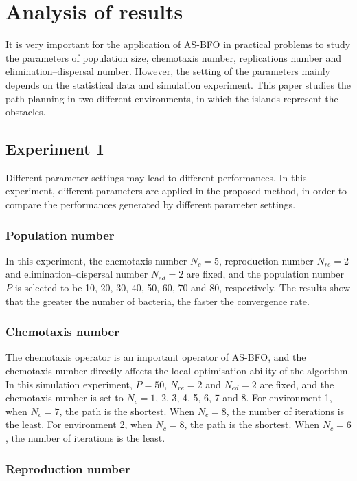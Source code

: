\documentclass{PDS}%
\theoremstyle{definition}
\begin{document}
\section{Analysis of results}\label{sec4}

It is very important for the application of AS-BFO in practical problems to study the
parameters of population size, chemotaxis number, replications number and
elimination--dispersal number. However, the setting of the parameters mainly depends on
the statistical data and simulation experiment. This paper studies the path planning in
two different environments, in which the islands represent the obstacles.

\subsection{Experiment 1}

Different parameter settings may lead to different performances. In this experiment,
different parameters are applied in the proposed method, in order to compare the
performances generated by different parameter settings.

\subsubsection{Population number}

In this experiment, the chemotaxis number $N_c=5$, reproduction number $N_{re}=2$ and
elimination--dispersal number $N_{ed}=2$ are fixed, and the population number $P$ is selected
to be 10, 20, 30, 40, 50, 60, 70 and 80, respectively. The results show that the greater the number of bacteria, the faster the convergence rate.

\subsubsection{Chemotaxis number}

The chemotaxis operator is an important operator of AS-BFO, and the chemotaxis number
directly affects the local optimisation ability of the algorithm. In this simulation
experiment, $P=50$, $N_{re}=2$ and $N_{ed} =2$ are fixed, and the chemotaxis number is set to $N_c
=1$, 2, 3, 4, 5, 6, 7 and 8. For environment
1, when $N_c =7$, the path is the shortest. When $N_c =8$, the number of iterations is
the least. For environment 2, when $N_c =8$, the path is the shortest. When $N_c =6$, the
number of iterations is the least.


\subsubsection{Reproduction number}
\end{document}
